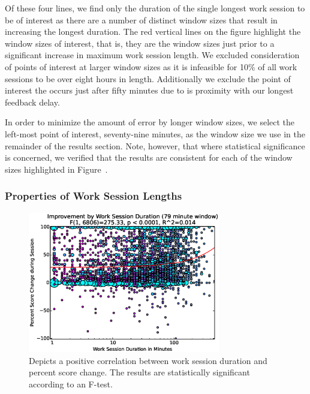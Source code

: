 Of these four lines, we find only the duration of the single longest work
session to be of interest as there are a number of distinct window sizes that
result in increasing the longest duration. The red vertical lines on the figure
highlight the window sizes of interest, that is, they are the window sizes just
prior to a significant increase in maximum work session length. We excluded
consideration of points of interest at larger window sizes as it is infeasible
for 10\% of all work sessions to be over eight hours in length. Additionally we
exclude the point of interest the occurs just after fifty minutes due to is
proximity with our longest feedback delay.

In order to minimize the amount of error by longer window sizes, we select the
left-most point of interest, seventy-nine minutes, as the window size we use in
the remainder of the results section. Note, however, that where statistical
significance is concerned, we verified that the results are consistent for each
of the window sizes highlighted in Figure~.

\subsubsection{Properties of Work Session Lengths}

\begin{figure}[!t]
\centering \includegraphics[width=3.3in]{graphs/Improvement_by_Work_Session_Duration_(79_minute_window).eps}
\caption{Depicts a positive correlation between work session duration and
  percent score change. The results are statistically significant according to
  an F-test.}
\end{figure}

